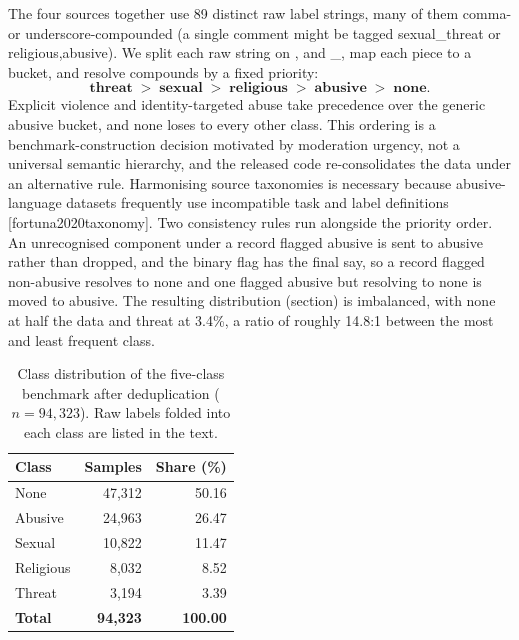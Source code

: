 \documentclass[11pt,a4paper]{article}
\def\citep#1{[#1]}%
\def\cref#1{section}%
\def\texttt#1{#1}%
\def\emph#1{#1}%
\begin{document}
The four sources together use 89 distinct raw label strings, many of them comma- or underscore-compounded (a single comment might be tagged \texttt{sexual\_threat} or \texttt{religious,abusive}). We split each raw string on \texttt{,} and \texttt{\_}, map each piece to a bucket, and resolve compounds by a fixed priority:
\begin{equation}
\textbf{threat} \;>\; \textbf{sexual} \;>\; \textbf{religious} \;>\; \textbf{abusive} \;>\; \textbf{none}.
\label{eq:priority}
\end{equation}
Explicit violence and identity-targeted abuse take precedence over the generic \emph{abusive} bucket, and \emph{none} loses to every other class. This ordering is a benchmark-construction decision motivated by moderation urgency, not a universal semantic hierarchy, and the released code re-consolidates the data under an alternative rule. Harmonising source taxonomies is necessary because abusive-language datasets frequently use incompatible task and label definitions \citep{fortuna2020taxonomy}. Two consistency rules run alongside the priority order. An unrecognised component under a record flagged abusive is sent to \emph{abusive} rather than dropped, and the binary flag has the final say, so a record flagged non-abusive resolves to \emph{none} and one flagged abusive but resolving to \emph{none} is moved to \emph{abusive}. The resulting distribution (\cref{tab:classes}) is imbalanced, with \emph{none} at half the data and \emph{threat} at 3.4\%, a ratio of roughly 14.8:1 between the most and least frequent class.

\begin{table}[!htbp]
\centering
\caption{Class distribution of the five-class benchmark after deduplication ($n = 94{,}323$). Raw labels folded into each class are listed in the text.}
\label{tab:classes}
\small
\begin{tabular}{@{}lrr@{}}
\toprule
\textbf{Class} & \textbf{Samples} & \textbf{Share (\%)} \\
\midrule
None & 47{,}312 & 50.16 \\
Abusive & 24{,}963 & 26.47 \\
Sexual & 10{,}822 & 11.47 \\
Religious & 8{,}032 & 8.52 \\
Threat & 3{,}194 & 3.39 \\
\midrule
\textbf{Total} & \textbf{94{,}323} & \textbf{100.00} \\
\bottomrule
\end{tabular}
\end{table}
\end{document}
